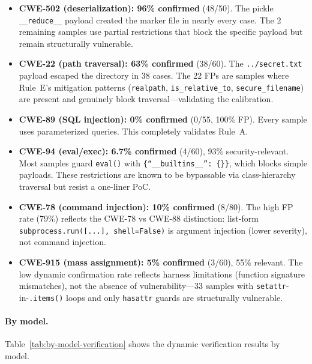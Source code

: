 \documentclass{article}
\newcommand{\code}[1]{\texttt{#1}}
\begin{document}
\begin{itemize}[leftmargin=*]
  \item \textbf{CWE-502 (deserialization): 96\% confirmed} (48/50). The
    pickle \code{\_\_reduce\_\_} payload created the marker file in nearly
    every case. The 2 remaining samples use partial restrictions that block
    the specific payload but remain structurally vulnerable.
  \item \textbf{CWE-22 (path traversal): 63\% confirmed} (38/60). The
    \code{../secret.txt} payload escaped the directory in 38 cases. The 22
    FPs are samples where Rule~E's mitigation patterns (\code{realpath},
    \code{is\_relative\_to}, \code{secure\_filename}) are present and
    genuinely block traversal---validating the calibration.
  \item \textbf{CWE-89 (SQL injection): 0\% confirmed} (0/55, 100\% FP).
    Every sample uses parameterized queries. This completely validates
    Rule~A.
  \item \textbf{CWE-94 (eval/exec): 6.7\% confirmed} (4/60), 93\%
    security-relevant. Most samples guard \code{eval()} with
    \code{\{``\_\_builtins\_\_'': \{\}\}}, which blocks simple payloads.
    These restrictions are known to be bypassable via class-hierarchy
    traversal but resist a one-liner PoC.
  \item \textbf{CWE-78 (command injection): 10\% confirmed} (8/80). The
    high FP rate (79\%) reflects the CWE-78 vs CWE-88 distinction:
    list-form \code{subprocess.run([...], shell=False)} is argument
    injection (lower severity), not command injection.
  \item \textbf{CWE-915 (mass assignment): 5\% confirmed} (3/60), 55\%
    relevant. The low dynamic confirmation rate reflects harness
    limitations (function signature mismatches), not the absence of
    vulnerability---33 samples with \code{setattr}-in-\code{.items()} loops
    and only \code{hasattr} guards are structurally vulnerable.
\end{itemize}

\paragraph{By model.} Table~\ref{tab:by-model-verification} shows the
dynamic verification results by model.
\end{document}
